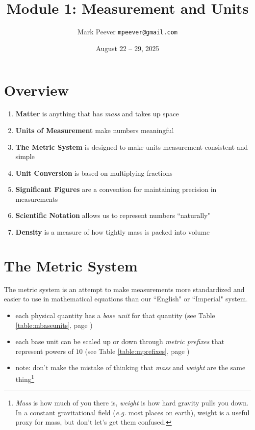 \documentclass[11pt, oneside]{article}   	%
\title{Module 1: Measurement and Units}
\author{Mark Peever \texttt{mpeever@gmail.com}}
\date{August 22 -- 29, 2025}
\begin{document}
\maketitle

\section{Overview}

\begin{enumerate}
\item \textbf{Matter} is anything that has \emph{mass} and takes up space
\item \textbf{Units of Measurement} make numbers meaningful
\item \textbf{The Metric System} is designed to make units measurement consistent and simple
\item \textbf{Unit Conversion} is based on multiplying fractions
\item \textbf{Significant Figures} are a convention for maintaining precision in measurements
\item \textbf{Scientific Notation} allows us to represent numbers ``naturally"   
\item \textbf{Density} is a measure of how tightly mass is packed into volume
\end{enumerate}


\section{The Metric System}
The metric system is an attempt to make measurements more standardized and easier to use in mathematical equations than our ``English" or ``Imperial" system.

\begin{itemize}
\item each physical quantity has a \emph{base unit} for that quantity \cite[p. 5]{wile-chem-2} (see Table \ref{table:mbaseunits}, page \pageref{table:mbaseunits})
\item each base unit can be scaled up or down through \emph{metric prefixes} that represent powers of $10$ \cite[p. 7]{wile-chem-2} (see Table \ref{table:mprefixes}, page \pageref{table:mprefixes})
\item note: don't make the mistake of thinking that \emph{mass} and \emph{weight} are the same thing\footnote{\emph{Mass} is how much of you there is, \emph{weight} is how hard gravity pulls you down. 
In a constant gravitational field (\emph{e.g.} most places on earth), weight is a useful proxy for mass, but don't let's get them confused.}
\end{itemize}
\end{document}
